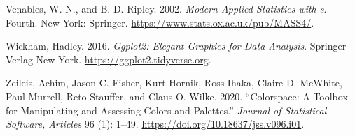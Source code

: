 \begin{CSLReferences}{1}{0}
\leavevmode{}%
Venables, W. N., and B. D. Ripley. 2002. \emph{Modern Applied Statistics with s}. Fourth. New York: Springer. \url{https://www.stats.ox.ac.uk/pub/MASS4/}.

\leavevmode{}%
Wickham, Hadley. 2016. \emph{Ggplot2: Elegant Graphics for Data Analysis}. Springer-Verlag New York. \url{https://ggplot2.tidyverse.org}.

\leavevmode{}%
Zeileis, Achim, Jason C. Fisher, Kurt Hornik, Ross Ihaka, Claire D. McWhite, Paul Murrell, Reto Stauffer, and Claus O. Wilke. 2020. {``Colorspace: A Toolbox for Manipulating and Assessing Colors and Palettes.''} \emph{Journal of Statistical Software, Articles} 96 (1): 1--49. \url{https://doi.org/10.18637/jss.v096.i01}.

\end{CSLReferences}



\address{%
Alan Inglis\\
Maynooth University\\%
Department of Mathematics and Statistics\\ Maynooth, Ireland\\
%
%
\textit{ORCiD: \href{https://orcid.org/0000-0002-1151-6657}{0000-0002-1151-6657}}\\%
\href{mailto:alan.inglis@mu.ie}{\nolinkurl{alan.inglis@mu.ie}}%
}

\address{%
Andrew Parnell\\
Maynooth University\\%
Hamilton Institute\\ Maynooth, Ireland\\
%
%
\textit{ORCiD: \href{https://orcid.org/0000-0001-7956-7939}{0000-0001-7956-7939}}\\%
\href{mailto:andrew.parnell@mu.ie}{\nolinkurl{andrew.parnell@mu.ie}}%
}

\address{%
Catherine Hurley\\
Maynooth University\\%
Department of Mathematics and Statistics\\ Maynooth, Ireland\\
%
%
\textit{ORCiD: \href{https://orcid.org/0000-0003-2758-5531}{0000-0003-2758-5531}}\\%
\href{mailto:catherine.hurley@mu.ie}{\nolinkurl{catherine.hurley@mu.ie}}%
}
